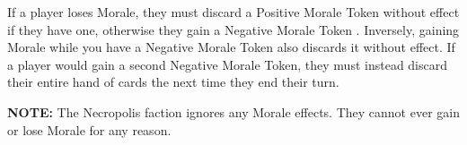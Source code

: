 If a player loses Morale, they must discard a Positive Morale Token  without effect if they have one, otherwise they gain a Negative Morale Token .
Inversely, gaining Morale while you have a Negative Morale Token also discards it without effect.
If a player would gain a second Negative Morale Token, they must instead discard their entire hand of cards the next time they end their turn.\par
\textbf{NOTE:} The Necropolis  faction ignores any Morale effects.
They cannot ever gain or lose Morale for any reason.
